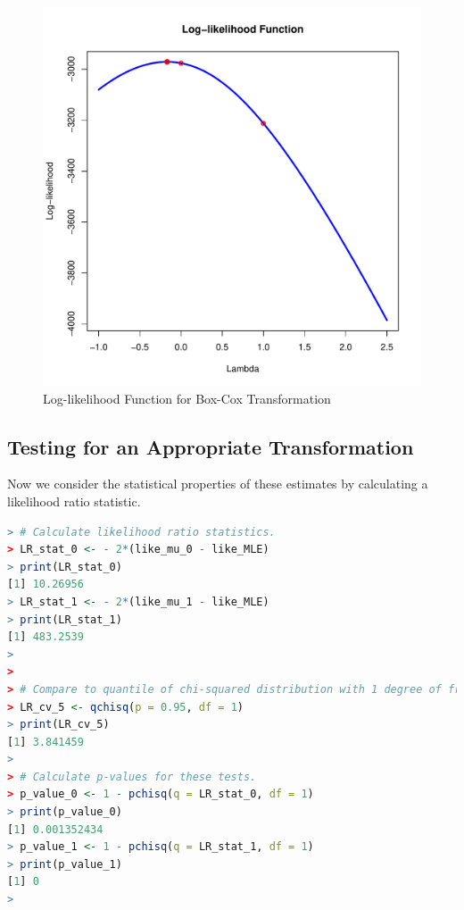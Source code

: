 \documentclass[11pt]{book}
\begin{document}
\begin{figure}[h!]
  \centering
  \includegraphics[scale = 0.5, keepaspectratio=true]{../Figures/box_cox_loglike_uni}
  \caption{Log-likelihood Function for Box-Cox Transformation} \label{fig:box_cox_loglike_uni}
\end{figure}


\pagebreak
\subsection{Testing for an Appropriate Transformation}

Now we consider the statistical properties of these estimates
by calculating a likelihood ratio statistic.

\begin{lstlisting}[language=R]
> # Calculate likelihood ratio statistics.
> LR_stat_0 <- - 2*(like_mu_0 - like_MLE)
> print(LR_stat_0)
[1] 10.26956
> LR_stat_1 <- - 2*(like_mu_1 - like_MLE)
> print(LR_stat_1)
[1] 483.2539
> 
> 
> # Compare to quantile of chi-squared distribution with 1 degree of freedom.
> LR_cv_5 <- qchisq(p = 0.95, df = 1)
> print(LR_cv_5)
[1] 3.841459
> 
> # Calculate p-values for these tests.
> p_value_0 <- 1 - pchisq(q = LR_stat_0, df = 1)
> print(p_value_0)
[1] 0.001352434
> p_value_1 <- 1 - pchisq(q = LR_stat_1, df = 1)
> print(p_value_1)
[1] 0
> 
\end{lstlisting}
\end{document}
